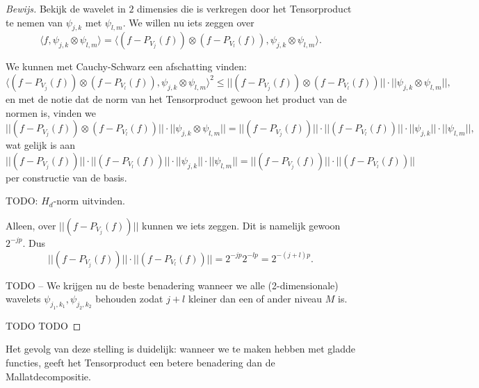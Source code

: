 \documentclass[11pt]{amsart}
\begin{document}
\begin{proof}[Bewijs]
Bekijk de wavelet in $2$ dimensies die is verkregen door het Tensorproduct te nemen
van $\psi_{j,k}$ met $\psi_{l,m}$. We willen nu iets zeggen over
\[
	\langle f, \psi_{j,k} \otimes \psi_{l,m} \rangle = \langle (f - P_{V_j}(f))\otimes(f - P_{V_l}(f)), \psi_{j,k} \otimes \psi_{l,m} \rangle.
\]

We kunnen met Cauchy-Schwarz een afschatting vinden:
\[
	\langle (f - P_{V_j}(f))\otimes(f - P_{V_l}(f)), \psi_{j,k} \otimes \psi_{l,m} \rangle^2 \leq ||(f - P_{V_j}(f))\otimes(f - P_{V_l}(f))|| \cdot ||\psi_{j,k} \otimes \psi_{l,m}||,
\]
en met de notie dat de norm van het Tensorproduct gewoon het product van de normen is, vinden we
\[
	||(f - P_{V_j}(f))\otimes(f - P_{V_l}(f))|| \cdot ||\psi_{j,k} \otimes \psi_{l,m}|| = ||(f - P_{V_j}(f))|| \cdot ||(f - P_{V_l}(f))|| \cdot ||\psi_{j,k} || \cdot || \psi_{l,m}||,
\]
wat gelijk is aan
\[
	||(f - P_{V_j}(f))|| \cdot ||(f - P_{V_l}(f))|| \cdot ||\psi_{j,k} || \cdot || \psi_{l,m}|| = ||(f - P_{V_j}(f))|| \cdot ||(f - P_{V_l}(f))||
\]
per constructie van de basis.

TODO: $H_d$-norm uitvinden.

Alleen, over $||(f - P_{V_j}(f))||$ kunnen we iets zeggen. Dit is namelijk gewoon $2^{-jp}$. Dus
\[
||(f - P_{V_j}(f))|| \cdot ||(f - P_{V_l}(f))|| = 2^{-jp}2^{-lp} = 2^{-(j+l)p}.
\]

TODO -- We krijgen nu de beste benadering wanneer we alle (2-dimensionale) wavelets $\psi_{j_1,k_1}, \psi_{j_2,k_2}$ behouden zodat $j+l$ kleiner dan een of ander niveau $M$ is. 

TODO TODO
\end{proof}

Het gevolg van deze stelling is duidelijk: wanneer we te maken hebben met gladde functies, geeft het Tensorproduct een betere benadering dan de Mallatdecompositie.
\end{document}
